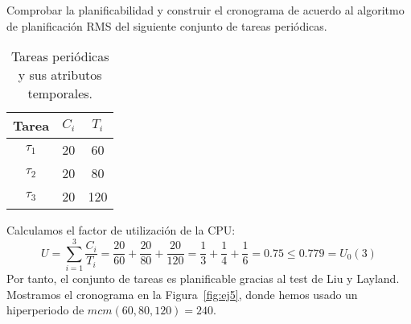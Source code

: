 \begin{ejercicio}\label{ej:rel4_5}
    Comprobar la planificabilidad y construir el cronograma de acuerdo al algoritmo de planificación RMS del siguiente conjunto de tareas periódicas.
    \begin{table}[H]
    \centering
    \begin{tabular}{|c|c|c|}
        \hline
        Tarea & $C_i$ & $T_i$ \\
        \hline
        $\tau_1$ & 20 & 60 \\
        \hline
        $\tau_2$ & 20 & 80 \\
        \hline
        $\tau_3$ & 20 & 120 \\
        \hline
    \end{tabular}
    \caption{Tareas periódicas y sus atributos temporales.}
    \label{tab:4_5}
    \end{table}

    Calculamos el factor de utilización de la CPU\@:
    \begin{equation*}
        U = \sum_{i=1}^{3} \dfrac{C_i}{T_i} = \dfrac{20}{60} + \dfrac{20}{80} + \dfrac{20}{120} = \dfrac{1}{3} + \dfrac{1}{4} + \dfrac{1}{6} = 0.75 \leq 0.779 = U_0(3)
    \end{equation*}
    Por tanto, el conjunto de tareas es planificable gracias al test de Liu y Layland. Mostramos el cronograma en la Figura~\ref{fig:ej5}, donde hemos usado un hiperperiodo de $mcm(60,80,120) = 240$.
    \begin{figure}[H]
        \centering
\end{figure}
\end{ejercicio}
